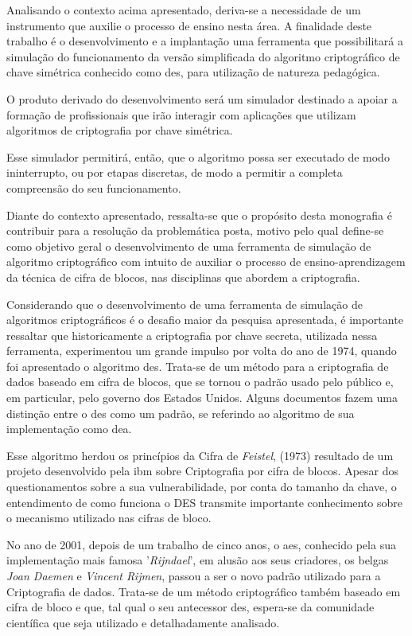 Analisando o contexto acima apresentado, deriva-se a necessidade de um instrumento que auxilie o processo de ensino nesta área. A finalidade deste trabalho é o desenvolvimento e a implantação uma ferramenta que possibilitará a simulação do funcionamento da versão simplificada do algoritmo criptográfico de chave simétrica conhecido como \acrfull{des}, para utilização de natureza pedagógica.

O produto derivado do desenvolvimento será um simulador destinado a apoiar a formação de profissionais que irão interagir com aplicações que utilizam algoritmos de criptografia por chave simétrica.

Esse simulador permitirá, então, que o algoritmo possa ser executado de modo ininterrupto, ou por etapas discretas, de modo a permitir a completa compreensão do seu funcionamento.

Diante do contexto apresentado, ressalta-se que o propósito desta monografia é contribuir para a resolução da problemática posta, motivo pelo qual define-se como objetivo geral o desenvolvimento de uma ferramenta de simulação de algoritmo criptográfico com intuito de auxiliar o processo de ensino-aprendizagem da técnica de cifra de blocos, nas disciplinas que abordem a criptografia.

Considerando que o desenvolvimento de uma ferramenta de simulação de algoritmos criptográficos é o desafio maior da pesquisa apresentada, é importante ressaltar que historicamente a criptografia por chave secreta, utilizada nessa ferramenta, experimentou um grande impulso por volta do ano de 1974, quando foi apresentado o algoritmo \acrfull{des}. Trata-se de um método para a criptografia de dados baseado em cifra de blocos, que se tornou o padrão usado pelo público e, em particular, pelo governo dos Estados Unidos. Alguns documentos fazem uma distinção entre o \acrshort{des} como um padrão, se referindo ao algoritmo de sua implementação como \acrfull{dea}.

Esse algoritmo herdou os princípios da Cifra de \textit{Feistel}, (1973) resultado de um projeto desenvolvido pela \acrfull{ibm} sobre Criptografia por cifra de blocos. Apesar dos questionamentos sobre a sua vulnerabilidade, por conta do tamanho da chave, o entendimento de como funciona o DES transmite importante conhecimento sobre o mecanismo utilizado nas cifras de bloco.

No ano de 2001, depois de um trabalho de cinco anos, o \acrfull{aes}, conhecido pela sua implementação mais famosa '\textit{Rijndael}', em alusão aos seus criadores, os belgas \textit{Joan Daemen} e \textit{Vincent Rijmen}, passou a ser o novo padrão utilizado para a Criptografia de dados. Trata-se de um método criptográfico também baseado em cifra de bloco e que, tal qual o seu antecessor \acrshort{des}, espera-se da comunidade científica que seja utilizado e detalhadamente analisado.

